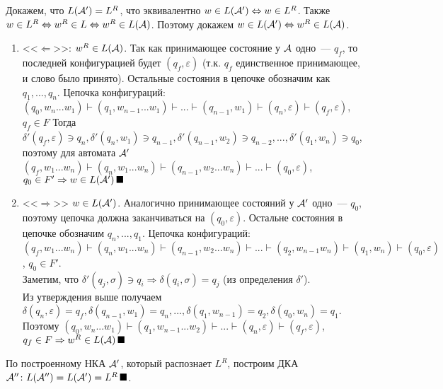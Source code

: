 \documentclass[a4paper]{article}
\def\A{{\cal A}}
\begin{document}
Докажем, что $L(\A')=L^R$, что эквивалентно $w\in L(\A')\Leftrightarrow w\in L^R$. Также $w\in L^R\Leftrightarrow w^R\in L\Leftrightarrow w^R \in L(\A)$. Поэтому докажем $w\in L(\A')\Leftrightarrow w^R\in L(\A)$.
\begin{enumerate}
\item <<$\Leftarrow$>>: $w^R\in L(\A)$. Так как принимающее состояние у $\A$ одно~--- $q_f$, то последней конфигурацией будет $(q_f,\varepsilon)$ (т.к. $q_f$ единственное принимающее, и слово было принято). Остальные состояния в цепочке обозначим как $q_1,...,q_n$. Цепочка конфигураций:\newline
$(q_0,w_n...w_1)\vdash(q_1,w_{n-1}...w_1)\vdash...\vdash(q_{n-1},w_1)\vdash(q_n,\varepsilon)\vdash(q_f,\varepsilon)$, $q_f\in F$\newline
Тогда $\delta'(q_f,\varepsilon)\ni q_n,\delta'(q_n,w_1)\ni q_{n-1},\delta'(q_{n-1},w_2)\ni q_{n-2},...,\delta'(q_1,w_n)\ni q_0$, поэтому для автомата $\A'$\newline
$(q_f,w_1...w_n)\vdash(q_n,w_1...w_n)\vdash(q_{n-1},w_2...w_n)\vdash...\vdash(q_0,\varepsilon)$, $q_0\in F'\Rightarrow w\in L(\A')\,\blacksquare$
\item <<$\Rightarrow$>> $w\in L(\A')$. Аналогично принимающее состояний у $\A'$ одно~--- $q_0$, поэтому цепочка должна заканчиваться на $(q_0,\varepsilon)$. Остальне состояния в цепочке обозначим $q_n,...,q_1$. Цепочка конфигураций:\newline $(q_f,w_1...w_n)\vdash(q_n,w_1...w_n)\vdash(q_{n-1},w_2...w_n)\vdash...\vdash(q_2,w_{n-1}w_n)\vdash(q_1,w_n)\vdash(q_0,\varepsilon)$, $q_0\in F'$.
\\[5pt]
Заметим, что $\delta'(q_j,\sigma)\ni q_i\Rightarrow \delta(q_i,\sigma)=q_j$ (из определения $\delta'$).
\\[5pt]
Из утверждения выше получаем $\delta(q_n,\varepsilon)=q_f,\delta(q_{n-1},w_1)=q_n,...,\delta(q_1,w_{n-1})=q_2,\delta(q_0,w_n)=q_1$.\newline
Поэтому $(q_0,w_n...w_1)\vdash(q_1,w_{n-1}...w_2)\vdash...\vdash(q_n,\varepsilon)\vdash(q_f,\varepsilon)$, $q_f\in F\Rightarrow w^R\in L(\A)\,\blacksquare$
\end{enumerate}
По построенному НКА $\A'$, который распознает $L^R$, построим ДКА $\A''\colon L(\A'')=L(\A')=L^R\,\blacksquare$.
\end{document}
